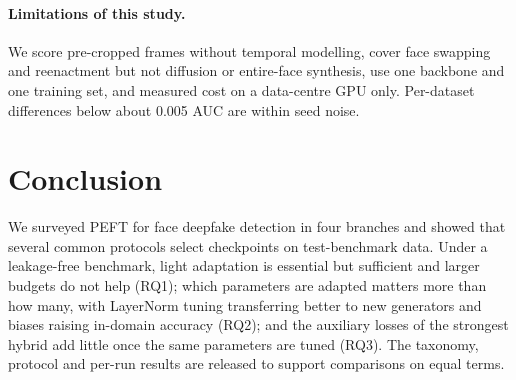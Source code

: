 \documentclass[fonts]{icst}
\begin{document}
\paragraph{Limitations of this study.}\label{sec:limits} We score pre-cropped frames without temporal modelling, cover face swapping and reenactment but not diffusion or entire-face synthesis, use one backbone and one training set, and measured cost on a data-centre GPU only. Per-dataset differences below about 0.005 AUC are within seed noise.

\section{Conclusion}
We surveyed PEFT for face deepfake detection in four branches and showed that several common protocols select checkpoints on test-benchmark data. Under a leakage-free benchmark, light adaptation is essential but sufficient and larger budgets do not help (RQ1); which parameters are adapted matters more than how many, with LayerNorm tuning transferring better to new generators and biases raising in-domain accuracy (RQ2); and the auxiliary losses of the strongest hybrid add little once the same parameters are tuned (RQ3). The taxonomy, protocol and per-run results are released to support comparisons on equal terms.
\end{document}

